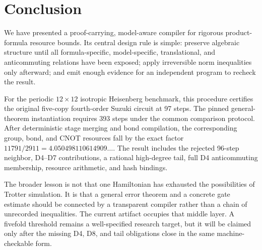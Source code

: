 \section{Conclusion}
\label{sec:conclusion}

We have presented a proof-carrying, model-aware compiler for rigorous
product-formula resource bounds.  Its central design rule is simple: preserve
algebraic structure until all formula-specific, model-specific, translational,
and anticommuting relations have been exposed; apply irreversible norm
inequalities only afterward; and emit enough evidence for an independent
program to recheck the result.

For the periodic $12\times12$ isotropic Heisenberg benchmark, this procedure
certifies the original five-copy fourth-order Suzuki circuit at 97 steps.  The
pinned general-theorem instantiation requires 393 steps under the common
comparison protocol.  After deterministic stage merging and bond
compilation, the corresponding group, bond, and CNOT resources fall by the
exact factor $11791/2911=4.050498110614909\ldots$.  The result includes the
rejected 96-step neighbor, D4--D7 contributions, a rational high-degree tail,
full D4 anticommuting membership, resource arithmetic, and hash bindings.

The broader lesson is not that one Hamiltonian has exhausted the possibilities
of Trotter simulation.  It is that a general error theorem and a concrete gate
estimate should be connected by a transparent compiler rather than a chain of
unrecorded inequalities.  The current artifact occupies that middle layer.  A
fivefold threshold remains a well-specified research target, but it will be
claimed only after the missing D4, D8, and tail obligations close in the same
machine-checkable form.
